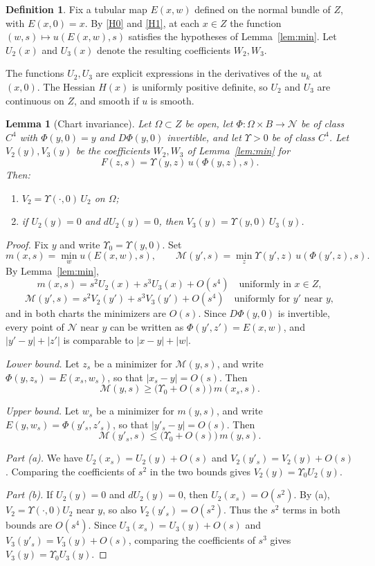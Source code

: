\documentclass[11pt]{amsart}
\newtheorem{lemma}[theorem]{Lemma}
\theoremstyle{definition}
\newtheorem{definition}[theorem]{Definition}
\theoremstyle{remark}
\newcommand{\Gr}{\mathcal{N}}
\begin{document}
\begin{definition}\label{def:U}
Fix a tubular map $E(x,w)$ defined on the normal bundle of $Z$, with $E(x,0)=x$. By \ref{H0} and \ref{H1}, at each $x\in Z$ the function $(w,s)\mapsto u(E(x,w),s)$ satisfies the hypotheses of Lemma~\ref{lem:min}. Let $U_2(x)$ and $U_3(x)$ denote the resulting coefficients $W_2,W_3$.
\end{definition}

The functions $U_2,U_3$ are explicit expressions in the derivatives of the $u_k$ at $(x,0)$. The Hessian $H(x)$ is uniformly positive definite, so $U_2$ and $U_3$ are continuous on $Z$, and smooth if $u$ is smooth.

\begin{lemma}[Chart invariance]\label{lem:chart}
Let $\Omega\subset Z$ be open, let $\Phi\colon\Omega\times B\to\Gr$ be of class $C^4$ with $\Phi(y,0)=y$ and $D\Phi(y,0)$ invertible, and let $\Upsilon>0$ be of class $C^4$. Let $V_2(y),V_3(y)$ be the coefficients $W_2,W_3$ of Lemma~\ref{lem:min} for
\[ F(z,s)=\Upsilon(y,z)\,u(\Phi(y,z),s) . \]
Then:
\begin{enumerate}[label=(\alph*)]
\item $V_2=\Upsilon(\cdot,0)\,U_2$ on $\Omega$;
\item if $U_2(y)=0$ and $dU_2(y)=0$, then $V_3(y)=\Upsilon(y,0)\,U_3(y)$.
\end{enumerate}
\end{lemma}

\begin{proof}
Fix $y$ and write $\Upsilon_0=\Upsilon(y,0)$. Set
\[ m(x,s)=\min_w u(E(x,w),s),\qquad \mathcal M(y',s)=\min_z\Upsilon(y',z)\,u(\Phi(y',z),s). \]
By Lemma~\ref{lem:min},
\[ m(x,s)=s^2U_2(x)+s^3U_3(x)+O(s^4)\quad\text{uniformly in }x\in Z, \]
\[ \mathcal M(y',s)=s^2V_2(y')+s^3V_3(y')+O(s^4)\quad\text{uniformly for }y'\text{ near }y, \]
and in both charts the minimizers are $O(s)$. Since $D\Phi(y,0)$ is invertible, every point of $\Gr$ near $y$ can be written as $\Phi(y',z')=E(x,w)$, and $|y'-y|+|z'|$ is comparable to $|x-y|+|w|$.

\emph{Lower bound.} Let $z_s$ be a minimizer for $\mathcal M(y,s)$, and write $\Phi(y,z_s)=E(x_s,w_s)$, so that $|x_s-y|=O(s)$. Then
\[ \mathcal M(y,s)\ge\big(\Upsilon_0+O(s)\big)\,m(x_s,s). \]

\emph{Upper bound.} Let $w_s$ be a minimizer for $m(y,s)$, and write $E(y,w_s)=\Phi(y'_s,z'_s)$, so that $|y'_s-y|=O(s)$. Then
\[ \mathcal M(y'_s,s)\le\big(\Upsilon_0+O(s)\big)\,m(y,s). \]

\emph{Part (a).} We have $U_2(x_s)=U_2(y)+O(s)$ and $V_2(y'_s)=V_2(y)+O(s)$. Comparing the coefficients of $s^2$ in the two bounds gives $V_2(y)=\Upsilon_0U_2(y)$.

\emph{Part (b).} If $U_2(y)=0$ and $dU_2(y)=0$, then $U_2(x_s)=O(s^2)$. By (a), $V_2=\Upsilon(\cdot,0)U_2$ near $y$, so also $V_2(y'_s)=O(s^2)$. Thus the $s^2$ terms in both bounds are $O(s^4)$. Since $U_3(x_s)=U_3(y)+O(s)$ and $V_3(y'_s)=V_3(y)+O(s)$, comparing the coefficients of $s^3$ gives $V_3(y)=\Upsilon_0U_3(y)$.
\end{proof}
\end{document}
